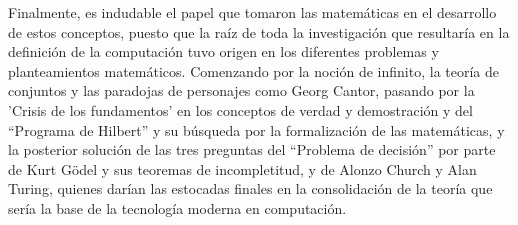 \documentclass[12pt]{article}
\begin{document}
{Finalmente, es indudable el papel que tomaron las matemáticas en el desarrollo de estos conceptos, puesto que la raíz de toda la investigación que resultaría en la definición de la computación tuvo origen en los diferentes problemas y planteamientos matemáticos. Comenzando por la noción de infinito, la teoría de conjuntos y las paradojas de personajes como Georg Cantor, pasando por la 'Crisis de los fundamentos' en los conceptos de verdad y demostración y del “Programa de Hilbert” y su búsqueda por la formalización de las matemáticas, y la posterior solución de las tres preguntas del “Problema de decisión” por parte de Kurt Gödel y sus teoremas de incompletitud, y de Alonzo Church y Alan Turing, quienes darían las estocadas finales en la consolidación de la teoría que sería la base de la tecnología moderna en computación.


\medskip

 



}
\end{document}
